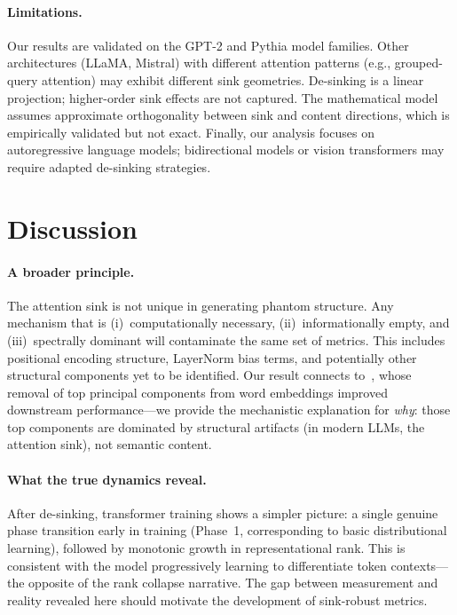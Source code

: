 \documentclass[11pt]{article}
\begin{document}
\paragraph{Limitations.}
Our results are validated on the GPT-2 and Pythia model families. Other architectures (LLaMA, Mistral) with different attention patterns (e.g., grouped-query attention) may exhibit different sink geometries. De-sinking is a linear projection; higher-order sink effects are not captured. The mathematical model assumes approximate orthogonality between sink and content directions, which is empirically validated but not exact. Finally, our analysis focuses on autoregressive language models; bidirectional models or vision transformers may require adapted de-sinking strategies.

\section{Discussion}\label{sec:discussion}

\paragraph{A broader principle.}
The attention sink is not unique in generating phantom structure. Any mechanism that is (i)~computationally necessary, (ii)~informationally empty, and (iii)~spectrally dominant will contaminate the same set of metrics. This includes positional encoding structure, LayerNorm bias terms, and potentially other structural components yet to be identified. Our result connects to~\citet{mu2018allbutthetop}, whose removal of top principal components from word embeddings improved downstream performance---we provide the mechanistic explanation for \emph{why}: those top components are dominated by structural artifacts (in modern LLMs, the attention sink), not semantic content.

\paragraph{What the true dynamics reveal.}
After de-sinking, transformer training shows a simpler picture: a single genuine phase transition early in training (Phase~1, corresponding to basic distributional learning), followed by monotonic growth in representational rank. This is consistent with the model progressively learning to differentiate token contexts---the opposite of the rank collapse narrative. The gap between measurement and reality revealed here should motivate the development of sink-robust metrics.
\end{document}
